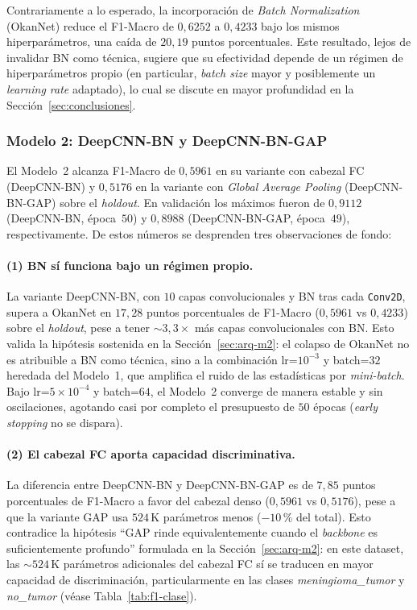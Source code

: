 Contrariamente a lo esperado, la incorporación de
\textit{Batch Normalization} (OkanNet) reduce el F1-Macro de
$0{,}6252$ a $0{,}4233$ bajo los mismos hiperparámetros, una
caída de $20{,}19$ puntos porcentuales. Este resultado, lejos
de invalidar BN como técnica, sugiere que su efectividad
depende de un régimen de hiperparámetros propio (en particular,
\textit{batch size} mayor y posiblemente un \textit{learning
rate} adaptado), lo cual se discute en mayor profundidad en la
Sección~\ref{sec:conclusiones}.

\subsubsection*{Modelo 2: DeepCNN-BN y DeepCNN-BN-GAP}

El Modelo~2 alcanza F1-Macro de $0{,}5961$ en su variante con
cabezal FC (DeepCNN-BN) y $0{,}5176$ en la variante con
\textit{Global Average Pooling} (DeepCNN-BN-GAP) sobre el
\textit{holdout}. En validación los máximos fueron de
$0{,}9112$ (DeepCNN-BN, época~$50$) y $0{,}8988$ (DeepCNN-BN-GAP,
época~$49$), respectivamente. De estos números se desprenden
tres observaciones de fondo:

\paragraph*{(1) BN sí funciona bajo un régimen propio.}
La variante DeepCNN-BN, con $10$ capas convolucionales y BN tras
cada \texttt{Conv2D}, supera a OkanNet en $17{,}28$ puntos
porcentuales de F1-Macro ($0{,}5961$ vs $0{,}4233$) sobre el
\textit{holdout}, pese a tener $\sim 3{,}3\times$ más capas
convolucionales con BN. Esto valida la hipótesis sostenida en la
Sección~\ref{sec:arq-m2}: el colapso de OkanNet no es atribuible
a BN como técnica, sino a la combinación lr=$10^{-3}$ y
batch=$32$ heredada del Modelo~1, que amplifica el ruido de las
estadísticas por \textit{mini-batch}. Bajo lr=$5\times 10^{-4}$
y batch=$64$, el Modelo~2 converge de manera estable y sin
oscilaciones, agotando casi por completo el presupuesto de $50$
épocas (\textit{early stopping} no se dispara).

\paragraph*{(2) El cabezal FC aporta capacidad discriminativa.}
La diferencia entre DeepCNN-BN y DeepCNN-BN-GAP es de $7{,}85$
puntos porcentuales de F1-Macro a favor del cabezal denso
($0{,}5961$ vs $0{,}5176$), pese a que la variante GAP usa
$524$\,K parámetros menos ($-10$\,\% del total). Esto contradice
la hipótesis ``GAP rinde equivalentemente cuando el
\textit{backbone} es suficientemente profundo'' formulada en la
Sección~\ref{sec:arq-m2}: en este dataset, las $\sim 524$\,K
parámetros adicionales del cabezal FC sí se traducen en mayor
capacidad de discriminación, particularmente en las clases
\textit{meningioma\_tumor} y \textit{no\_tumor} (véase
Tabla~\ref{tab:f1-clase}).

